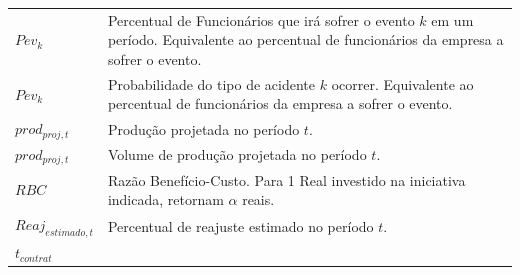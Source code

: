 \documentclass[]{article}
\begin{document}
\begin{longtable}[]{@{}ll@{}}
\begin{minipage}[t]{0.07\columnwidth}
\(Pev_{k}\)\strut
\end{minipage} & \begin{minipage}[t]{0.87\columnwidth}\raggedright\strut
Percentual de Funcionários que irá sofrer o evento \(k\) em um período.
Equivalente ao percentual de funcionários da empresa a sofrer o
evento.\strut
\end{minipage}\tabularnewline
\begin{minipage}[t]{0.07\columnwidth}\raggedright\strut
\(Pev_{k}\)\strut
\end{minipage} & \begin{minipage}[t]{0.87\columnwidth}\raggedright\strut
Probabilidade do tipo de acidente \(k\) ocorrer. Equivalente ao
percentual de funcionários da empresa a sofrer o evento.\strut
\end{minipage}\tabularnewline
\begin{minipage}[t]{0.07\columnwidth}\raggedright\strut
\(prod_{proj, t}\)\strut
\end{minipage} & \begin{minipage}[t]{0.87\columnwidth}\raggedright\strut
Produção projetada no período \(t\).\strut
\end{minipage}\tabularnewline
\begin{minipage}[t]{0.07\columnwidth}\raggedright\strut
\(prod_{proj, t}\)\strut
\end{minipage} & \begin{minipage}[t]{0.87\columnwidth}\raggedright\strut
Volume de produção projetada no período \(t\).\strut
\end{minipage}\tabularnewline
\begin{minipage}[t]{0.07\columnwidth}\raggedright\strut
\(RBC\)\strut
\end{minipage} & \begin{minipage}[t]{0.87\columnwidth}\raggedright\strut
Razão Benefício-Custo. Para 1 Real investido na iniciativa indicada,
retornam \(\alpha\) reais.\strut
\end{minipage}\tabularnewline
\begin{minipage}[t]{0.07\columnwidth}\raggedright\strut
\(Reaj_{estimado, t}\)\strut
\end{minipage} & \begin{minipage}[t]{0.87\columnwidth}\raggedright\strut
Percentual de reajuste estimado no período \(t\).\strut
\end{minipage}\tabularnewline
\begin{minipage}[t]{0.07\columnwidth}\raggedright\strut
\(t_{contrat}\)\strut
\end{minipage} & \begin{minipage}[t]{0.87\columnwidth}\raggedright\strut

\end{minipage}
\end{longtable}
\end{document}
